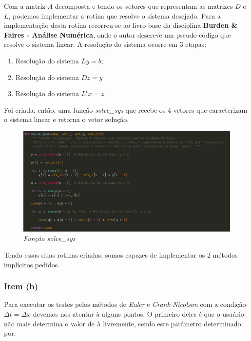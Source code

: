 \documentclass[a4paper, 12pt]{article}
\begin{document}
Com a matriz $A$ decomposta e tendo os vetores que representam as matrizes $D$ e $L$, podemos implementar a rotina que resolve o sistema desejado. Para a implementação desta rotina recorreu-se ao livro base da disciplina \textbf{Burden \& Faires - Análise Numérica}, onde o autor descreve um pseudo-código que resolve o sistema linear. A resolução do sistema ocorre em 3 etapas:

\begin{enumerate}[i]
	
	\item Resolução do sistema $Ly=b$;
	
	\item Resolução do sistema $Dz=y$
	
	\item Resolução do sistema $L^{t}x=z$

\end{enumerate}

Foi criada, então, uma função \textit{solve\_sys} que recebe os 4 vetores que caracterizam o sistema linear e retorna o vetor solução. 

\begin{figure}[H]
	\centering
	\includegraphics[scale=0.5]{img/solve_sys.png}
	\caption{\textit{Função solve\_sys}}
\end{figure}

Tendo essas duas rotinas criadas, somos capazes de implementar os 2 métodos implícitos pedidos.

\subsubsection{Item (b)}

Para executar os testes pelos métodos de \textit{Euler} e \textit{Crank-Nicolson} com a condição $\Delta t = \Delta x$ devemos nos atentar à alguns pontos. O primeiro deles é que o usuário não mais determina o valor de $\lambda$ livremente, sendo este parâmetro determinado por:
\end{document}

